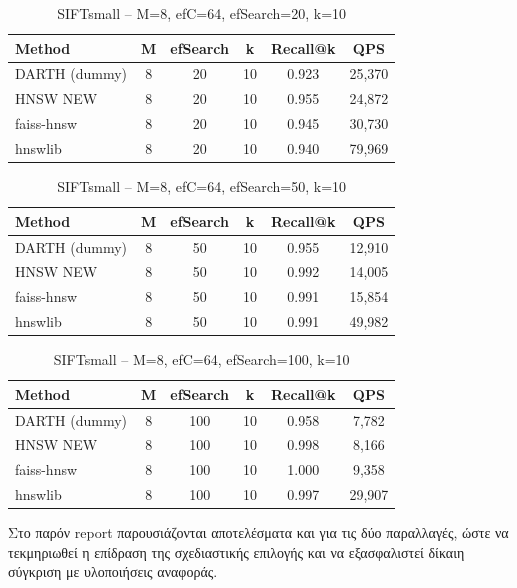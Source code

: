 \documentclass[12pt,a4paper]{article}
\begin{document}
\begin{table}[h]
\centering
\caption{SIFTsmall – M=8, efC=64, efSearch=20, k=10}
\begin{tabular}{|l|c|c|c|c|c|}
\hline
Method & M & efSearch & k & Recall@k & QPS \\
\hline
DARTH (dummy) & 8  & 20 & 10 & 0.923  & 25,370 \\
HNSW NEW      & 8  & 20 & 10 & 0.955  & 24,872 \\
faiss-hnsw    & 8  & 20 & 10 & 0.945  & 30,730 \\
hnswlib       & 8  & 20 & 10 & 0.940  & 79,969 \\
\hline
\end{tabular}
\end{table}

\begin{table}[H]
\centering
\caption{SIFTsmall – M=8, efC=64, efSearch=50, k=10}
\begin{tabular}{|l|c|c|c|c|c|}
\hline
Method & M & efSearch & k & Recall@k & QPS \\
\hline
DARTH (dummy) & 8  & 50 & 10 & 0.955  & 12,910 \\
HNSW NEW      & 8  & 50 & 10 & 0.992  & 14,005 \\
faiss-hnsw    & 8  & 50 & 10 & 0.991  & 15,854 \\
hnswlib       & 8  & 50 & 10 & 0.991  & 49,982 \\
\hline
\end{tabular}
\end{table}

\begin{table}[H]
\centering
\caption{SIFTsmall – M=8, efC=64, efSearch=100, k=10}
\begin{tabular}{|l|c|c|c|c|c|}
\hline
Method & M & efSearch & k & Recall@k & QPS \\
\hline
DARTH (dummy) & 8  & 100 & 10 & 0.958  & 7,782 \\
HNSW NEW      & 8  & 100 & 10 & 0.998  & 8,166 \\
faiss-hnsw    & 8  & 100 & 10 & 1.000  & 9,358 \\
hnswlib       & 8  & 100 & 10 & 0.997  & 29,907 \\
\hline
\end{tabular}
\end{table}

Στο παρόν report παρουσιάζονται αποτελέσματα και για τις δύο παραλλαγές, ώστε να τεκμηριωθεί η επίδραση της σχεδιαστικής επιλογής και να εξασφαλιστεί δίκαιη σύγκριση με υλοποιήσεις αναφοράς.
\end{document}
